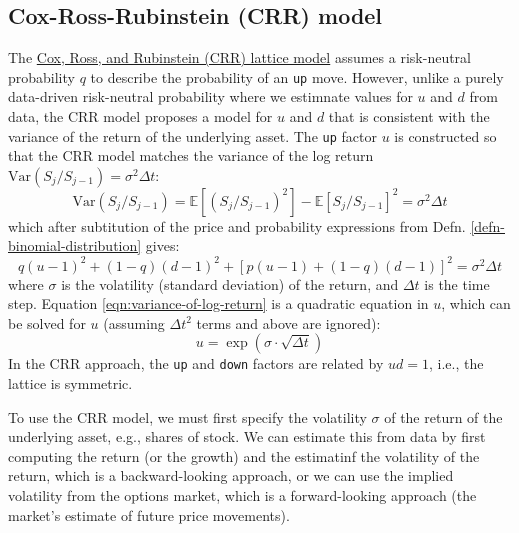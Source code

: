 \documentclass[11pt]{article}
\theoremstyle{definition}
\begin{document}
\subsection{Cox-Ross-Rubinstein (CRR) model}
The \href{https://en.wikipedia.org/wiki/Binomial_options_pricing_model}{Cox, Ross, and Rubinstein (CRR) lattice model} 
assumes a risk-neutral probability $q$ to describe the probability of an \texttt{up} move. However, unlike a purely data-driven risk-neutral probability where we estimnate 
values for $u$ and $d$ from data, the CRR model proposes a model for $u$ and $d$ that is consistent with the variance of the return of the underlying asset.
The \texttt{up} factor $u$ is constructed so that the CRR model matches the variance of the log return $\text{Var}(S_{j}/S_{j-1})=\sigma^{2}\Delta{t}$:
\begin{equation*}
	\text{Var}(S_{j}/S_{j-1}) = \mathbb{E}\left[(S_{j}/S_{j-1})^{2}\right] - \mathbb{E}\left[S_{j}/S_{j-1}\right]^{2} = \sigma^{2}\Delta{t}
\end{equation*}
which after subtitution of the price and probability expressions from Defn. \ref{defn-binomial-distribution} gives:
\begin{equation}\label{eqn:variance-of-log-return}
    q(u-1)^{2} + (1-q)(d-1)^{2} + \left[p(u-1)+(1-q)(d-1)\right]^{2} = \sigma^{2}\Delta{t}
\end{equation}
where $\sigma$ is the volatility (standard deviation) of the return, and $\Delta{t}$ is the time step.
Equation \eqref{eqn:variance-of-log-return} is a quadratic equation in $u$, which can be solved for $u$ (assuming $\Delta{t}^{2}$ terms and above are ignored):
\begin{equation*}
    u = \exp(\sigma\cdot\sqrt{\Delta{t}})
\end{equation*} 
In the CRR approach, the \texttt{up} and \texttt{down} factors are related by $ud=1$, i.e., the lattice is symmetric.

To use the CRR model, we must first specify the volatility $\sigma$ of the return of the underlying asset, e.g., shares of stock.
We can estimate this from data by first computing the return (or the growth) and the estimatinf the volatility of the return, which is a backward-looking approach, 
or we can use the implied volatility from the options market, which is a forward-looking approach (the market's estimate of future price movements).
\end{document}
